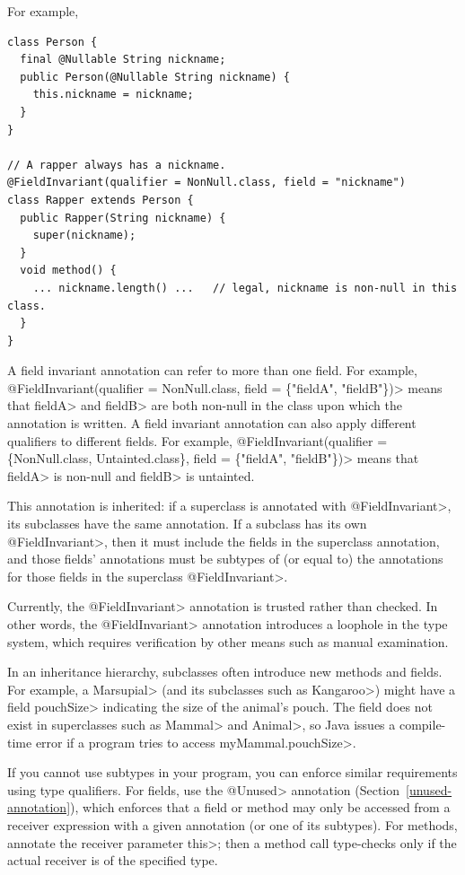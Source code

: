 For example,
\begin{Verbatim}
class Person {
  final @Nullable String nickname;
  public Person(@Nullable String nickname) {
    this.nickname = nickname;
  }
}

// A rapper always has a nickname.
@FieldInvariant(qualifier = NonNull.class, field = "nickname")
class Rapper extends Person {
  public Rapper(String nickname) {
    super(nickname);
  }
  void method() {
    ... nickname.length() ...   // legal, nickname is non-null in this class.
  }
}
\end{Verbatim}
 A field invariant annotation can refer to more than one field. For example,
\<@FieldInvariant(qualifier = NonNull.class, field = \{"fieldA", "fieldB"\})> means
that \<fieldA> and \<fieldB> are both non-null in the class upon which the
annotation is written.  A field invariant annotation
can also apply different qualifiers to different fields. For example,
\<@FieldInvariant(qualifier = \{NonNull.class, Untainted.class\}, field =
\{"fieldA", "fieldB"\})> means that \<fieldA> is non-null and \<fieldB> is untainted.

This annotation is inherited:  if a superclass is annotated with
\<@FieldInvariant>, its subclasses have the same annotation. If a subclass has its
own \<@FieldInvariant>, then it must include the fields in the superclass
annotation, and those fields' annotations must be subtypes of (or equal to) the
annotations for those fields in the superclass \<@FieldInvariant>.

Currently, the \<@FieldInvariant> annotation is trusted rather than
checked.  In other words, the \<@FieldInvariant> annotation introduces a
loophole in the type system, which requires verification by other means
such as manual examination.



In an inheritance hierarchy, subclasses often introduce new methods and
fields.  For example, a \<Marsupial> (and its subclasses such as
\<Kangaroo>) might have a field \<pouchSize> indicating the size of the animal's
pouch.  The field does not exist in superclasses such as
\<Mammal> and \<Animal>, so Java issues a compile-time
error if a program tries to access \<myMammal.pouchSize>.

If you cannot use subtypes in your program, you can enforce similar
requirements using type qualifiers.
For fields, use the \<@Unused> annotation (Section~\ref{unused-annotation}), which enforces that a field or method may only
be accessed from a receiver expression with a given annotation (or one of
its subtypes).
For methods, annotate the receiver parameter \<this>; then a method call
type-checks only if the actual receiver is of the specified type.

